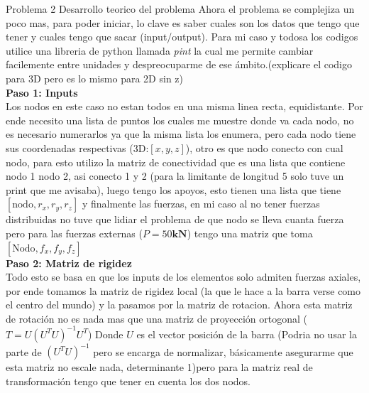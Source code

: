 \begin{desarrollo}{Problema 2 Desarrollo teorico del problema}
    Ahora el problema se complejiza un poco mas, para poder iniciar, lo clave es saber cuales son los datos que tengo que tener y cuales tengo que sacar (input/output).
    Para mi caso y todosa los codigos utilice una libreria de python llamada \textit{pint} la cual me permite cambiar facilemente entre unidades y despreocuparme de ese ámbito.(explicare el codigo para 3D pero es lo mismo para 2D sin z)\\

    \textbf{Paso 1: Inputs}\\
    Los nodos en este caso no estan todos en una misma linea recta, equidistante. Por ende necesito una lista de puntos los cuales me muestre donde va cada nodo, no es necesario numerarlos ya que la misma lista los enumera, pero cada nodo tiene sus coordenadas respectivas (3D:$[x,y,z]$), otro es que nodo conecto con cual nodo, para esto utilizo la matriz de conectividad que es una lista que contiene nodo 1 nodo 2, asi conecto 1 y 2 (para la limitante de longitud 5 solo tuve un print que me avisaba), luego tengo los apoyos, esto tienen una lista que tiene $[\text{nodo}, r_x,r_y,r_z]$ y finalmente las fuerzas, en mi caso al no tener fuerzas distribuidas no tuve que lidiar el problema de que nodo se lleva cuanta fuerza pero para las fuerzas externas ($P=50\textbf{kN}$) tengo una matriz que toma 
    $[\text{Nodo},f_x,f_y,f_z]$\\

    \textbf{Paso 2: Matriz de rigidez}\\
    Todo esto se basa en que los inputs de los elementos solo admiten fuerzas axiales, por ende tomamos la matriz de rigidez local (la que le hace a la barra verse como el centro del mundo) y la pasamos por la matriz de rotacion.
    Ahora esta matriz de rotación no es nada mas que una matriz de proyección ortogonal ($T= U(U^T U)^{-1}U^T$)
    Donde $U$ es el vector posición de la barra (Podria no usar la parte de $(U^T U)^{-1}$ pero se encarga de normalizar, básicamente asegurarme que esta matriz no escale nada, determinante 1)pero para la matriz real de transformación tengo que tener en cuenta los dos nodos.\\
    

\end{desarrollo}
